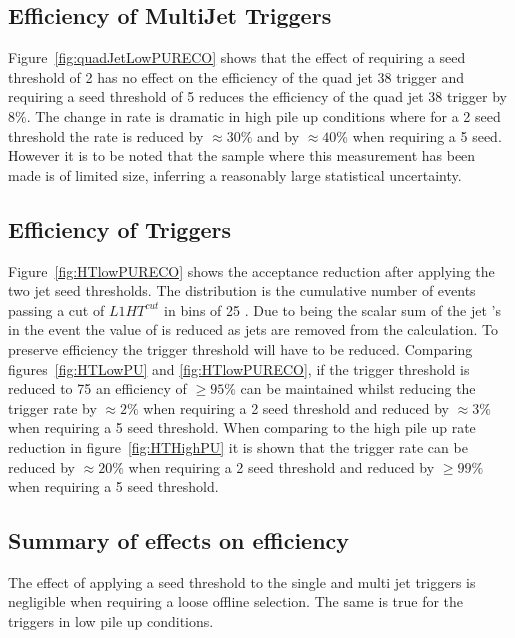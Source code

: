 \subsection{Efficiency of MultiJet Triggers} %
\label{sub:Efficiency of MultiJet Triggers}
Figure~\ref{fig:quadJetLowPURECO} shows that the effect of requiring a seed 
threshold of 2 \GeV has no effect on the efficiency of the quad jet 38 \GeV 
trigger and requiring a seed threshold of 5 \GeV reduces the efficiency of the 
quad jet 38 trigger by $8\%$. The change in rate is dramatic in high pile up 
conditions where for a 2 \GeV seed threshold the rate is reduced by 
$\approx 30\%$ and by $\approx 40\%$ when requiring a 5 \GeV seed.
However it is to be noted that the sample where this measurement has been made 
is of limited size, inferring a reasonably large statistical uncertainty. 


\subsection{Efficiency of \HT Triggers} %
\label{sub:Efficneicy of HT triggers}
Figure~\ref{fig:HTlowPURECO} shows the acceptance reduction after applying the 
two jet seed thresholds. The distribution is the cumulative number of events 
passing a cut of $L1 HT^{cut}$ in bins of 25 \GeV. Due to \HT being the scalar 
sum of the jet \PT's in the event the value of \Lone \HT is reduced as jets are 
removed from the calculation. To preserve efficiency the \Lone trigger 
threshold will have to be reduced. Comparing figures~\ref{fig:HTLowPU} and 
\ref{fig:HTlowPURECO}, if the trigger threshold is reduced to 75 \GeV an 
efficiency of $\geq 95\%$ can be maintained whilst reducing the trigger rate by 
$\approx 2\%$ when requiring a 2 \GeV seed threshold and reduced by $\approx 
3\%$ when requiring a 5 \GeV seed threshold. When comparing to the high pile up 
rate reduction in figure~\ref{fig:HTHighPU} it is shown that the trigger rate 
can be reduced by $\approx 20\%$ when requiring a 2 \GeV seed threshold and
reduced by $\geq 99\%$ when requiring a 5 \GeV seed threshold.


\subsection{Summary of effects on efficiency} %
\label{sub:Summary of effects on efficiency}
The effect of applying a seed threshold to the single and multi jet triggers is 
negligible when requiring a loose offline selection. The same is true for the 
\HT triggers in low pile up conditions.

